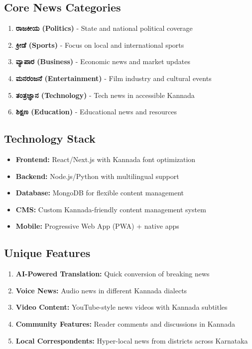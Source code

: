 \documentclass[11pt,a4paper]{article}
\begin{document}
\subsection{Core News Categories}
\begin{enumerate}[leftmargin=2em]
    \item \textbf{ರಾಜಕೀಯ (Politics)} - State and national political coverage
    \item \textbf{ಕ್ರೀಡೆ (Sports)} - Focus on local and international sports
    \item \textbf{ವ್ಯಾಪಾರ (Business)} - Economic news and market updates
    \item \textbf{ಮನರಂಜನೆ (Entertainment)} - Film industry and cultural events
    \item \textbf{ತಂತ್ರಜ್ಞಾನ (Technology)} - Tech news in accessible Kannada
    \item \textbf{ಶಿಕ್ಷಣ (Education)} - Educational news and resources
\end{enumerate}

\subsection{Technology Stack}
\begin{itemize}[leftmargin=2em]
    \item \textbf{Frontend:} React/Next.js with Kannada font optimization
    \item \textbf{Backend:} Node.js/Python with multilingual support
    \item \textbf{Database:} MongoDB for flexible content management
    \item \textbf{CMS:} Custom Kannada-friendly content management system
    \item \textbf{Mobile:} Progressive Web App (PWA) + native apps
\end{itemize}

\subsection{Unique Features}
\begin{enumerate}[leftmargin=2em]
    \item \textbf{AI-Powered Translation:} Quick conversion of breaking news
    \item \textbf{Voice News:} Audio news in different Kannada dialects
    \item \textbf{Video Content:} YouTube-style news videos with Kannada subtitles
    \item \textbf{Community Features:} Reader comments and discussions in Kannada
    \item \textbf{Local Correspondents:} Hyper-local news from districts across Karnataka
\end{enumerate}
\end{document}
